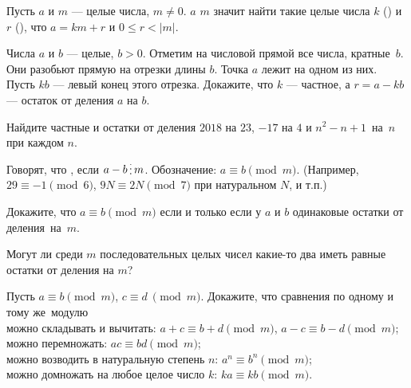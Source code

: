 \documentclass[12pt,a4paper]{article}
\begin{document}





Пусть $a$ и $m$ --- целые числа, $m\ne 0$.
 $a$  $m$  значит найти
такие целые числа $k$ () и $r$ (),
что $a = km + r$ и $0\leq r < |m|$.

Числа $a$ и $b$ --- целые, $b>0$.
Отметим на числовой прямой все числа, кратные~$b$.
Они разобьют прямую на отрезки длины $b$.
Точка $a$ лежит на одном из них.
Пусть $kb$ --- левый конец этого отрезка.
Докажите, что $k$ --- частное, а
$r = a - kb$ --- остаток от деления $a$ на $b$.

Найдите частные и остатки от деления $2018$ на $23$, $-17$ на $4$ и
$n^2-n+1$~на~$n$ при каждом $n$.

Говорят, что , если
$a-b\del m$. Обозначение: $a\equiv b\!\pmod{m}$.
(Например, $29\equiv -1\!\pmod{6}$, $9N\equiv 2N\!\pmod{7}$ при натуральном $N$, и т.п.)

Докажите, что $a\equiv b\!\pmod{m}$ если и только если у $a$ и $b$
одинаковые остатки от деления~на~$m$.

Могут ли среди $m$ последовательных целых чисел какие-то два иметь равные остатки от деления на $m$?



Пусть $a\equiv b\!\pmod{m}$,  $c\equiv d\ \!\pmod{m}$.
Докажите, что сравнения по одному и тому же~модулю\\ %
можно складывать и вычитать: $a+c\equiv b+d\!\pmod{m}$, $a-c\equiv b-d\!\pmod{m}$;\\
можно перемножать: $ac\equiv bd\!\pmod{m}$;\\
можно возводить в натуральную степень $n$: $a^n\equiv b^n\!\pmod{m}$;\\
можно домножать на любое целое число $k$: $ka\equiv kb\!\pmod{m}$.
\end{document}
